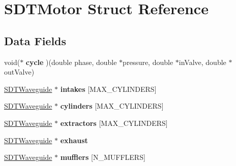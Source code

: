 \hypertarget{struct_s_d_t_motor}{}\section{S\+D\+T\+Motor Struct Reference}
\label{struct_s_d_t_motor}
\subsection*{Data Fields}
\begin{DoxyCompactItemize}
\item 
\hypertarget{struct_s_d_t_motor_a5b15de94ccb6d647a1013e8777272a58}{}void($\ast$ {\bfseries cycle} )(double phase, double $\ast$pressure, double $\ast$in\+Valve, double $\ast$out\+Valve)\label{struct_s_d_t_motor_a5b15de94ccb6d647a1013e8777272a58}

\item 
\hypertarget{struct_s_d_t_motor_a59a849712c622993a06da321c11c2767}{}\hyperlink{struct_s_d_t_waveguide}{S\+D\+T\+Waveguide} $\ast$ {\bfseries intakes} \mbox{[}M\+A\+X\+\_\+\+C\+Y\+L\+I\+N\+D\+E\+R\+S\mbox{]}\label{struct_s_d_t_motor_a59a849712c622993a06da321c11c2767}

\item 
\hypertarget{struct_s_d_t_motor_a7ff606ba60c405fc0630daddd0d5d2f6}{}\hyperlink{struct_s_d_t_waveguide}{S\+D\+T\+Waveguide} $\ast$ {\bfseries cylinders} \mbox{[}M\+A\+X\+\_\+\+C\+Y\+L\+I\+N\+D\+E\+R\+S\mbox{]}\label{struct_s_d_t_motor_a7ff606ba60c405fc0630daddd0d5d2f6}

\item 
\hypertarget{struct_s_d_t_motor_a48ef2fa40ebb6ec3554d16e0f229d8be}{}\hyperlink{struct_s_d_t_waveguide}{S\+D\+T\+Waveguide} $\ast$ {\bfseries extractors} \mbox{[}M\+A\+X\+\_\+\+C\+Y\+L\+I\+N\+D\+E\+R\+S\mbox{]}\label{struct_s_d_t_motor_a48ef2fa40ebb6ec3554d16e0f229d8be}

\item 
\hypertarget{struct_s_d_t_motor_a55f83e5063d7879ef0b1b66208fd6019}{}\hyperlink{struct_s_d_t_waveguide}{S\+D\+T\+Waveguide} $\ast$ {\bfseries exhaust}\label{struct_s_d_t_motor_a55f83e5063d7879ef0b1b66208fd6019}

\item 
\hypertarget{struct_s_d_t_motor_af41b0347248e9c6bf81472caceaa45de}{}\hyperlink{struct_s_d_t_waveguide}{S\+D\+T\+Waveguide} $\ast$ {\bfseries mufflers} \mbox{[}N\+\_\+\+M\+U\+F\+F\+L\+E\+R\+S\mbox{]}\label{struct_s_d_t_motor_af41b0347248e9c6bf81472caceaa45de}


\end{DoxyCompactItemize}
